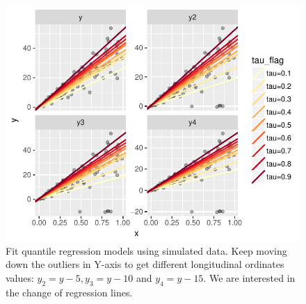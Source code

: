 \documentclass[article]{jss}
\theoremstyle{definition}
\theoremstyle{definition}
\theoremstyle{remark}
\begin{document}
\begin{CodeChunk}
\begin{figure}

{\centering \includegraphics{Diagnosing_outliers_and_visualization_of_quantile_regression_models_files/figure-latex/move-y1-1} 

}

\caption[Fit quantile regression models using simulated data]{Fit quantile regression models using simulated data. Keep moving down the outliers in Y-axis to get different longitudinal ordinates values: $y_{2}=y-5, y_{3}=y-10$ and $y_{4}=y-15$. We are interested in the change of regression lines.}\label{fig:move-y1}
\end{figure}
\end{CodeChunk}
\end{document}

